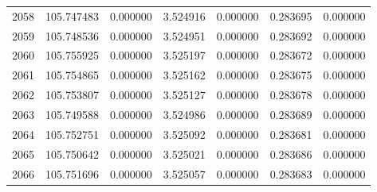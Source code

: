 \begin{tabular}{rrrrrrr}
2058 & 105.747483 &    0.000000 &  3.524916 &   0.000000 &   0.283695 &  0.000000 \\
2059 & 105.748536 &    0.000000 &  3.524951 &   0.000000 &   0.283692 &  0.000000 \\
2060 & 105.755925 &    0.000000 &  3.525197 &   0.000000 &   0.283672 &  0.000000 \\
2061 & 105.754865 &    0.000000 &  3.525162 &   0.000000 &   0.283675 &  0.000000 \\
2062 & 105.753807 &    0.000000 &  3.525127 &   0.000000 &   0.283678 &  0.000000 \\
2063 & 105.749588 &    0.000000 &  3.524986 &   0.000000 &   0.283689 &  0.000000 \\
2064 & 105.752751 &    0.000000 &  3.525092 &   0.000000 &   0.283681 &  0.000000 \\
2065 & 105.750642 &    0.000000 &  3.525021 &   0.000000 &   0.283686 &  0.000000 \\
2066 & 105.751696 &    0.000000 &  3.525057 &   0.000000 &   0.283683 &  0.000000 \\
\bottomrule
\end{tabular}
